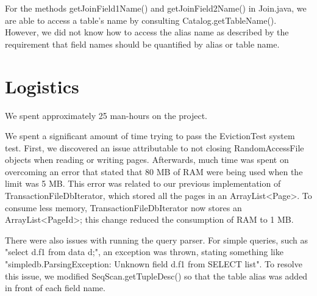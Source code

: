 \documentclass[paper=a4, fontsize=11pt]{scrartcl} %
\numberwithin{equation}{section} %
\numberwithin{figure}{section} %
\numberwithin{table}{section} %
\begin{document}
For the methods getJoinField1Name() and getJoinField2Name() in Join.java, we are able to access a table's name by consulting Catalog.getTableName(). However, we did not know how to access the alias name as described by the requirement that field names should be quantified by alias or table name.




\section{Logistics}

We spent approximately 25 man-hours on the project.

We spent a significant amount of time trying to pass the EvictionTest system test. First, we discovered an issue attributable to not closing RandomAccessFile objects when reading or writing pages. Afterwards, much time was spent on overcoming an error that stated that 80 MB of RAM were being used when the limit was 5 MB. This error was related to our previous implementation of TransactionFileDbIterator, which stored all the pages in an ArrayList<Page>. To consume less memory, TransactionFileDbIterator now stores an ArrayList<PageId>; this change reduced the consumption of RAM to 1 MB.

There were also issues with running the query parser. For simple queries, such as "select d.f1 from data d;", an exception was thrown, stating something like "simpledb.ParsingException: Unknown field d.f1 from SELECT list". To resolve this issue, we modified SeqScan.getTupleDesc() so that the table alias was added in front of each field name.
\end{document}
